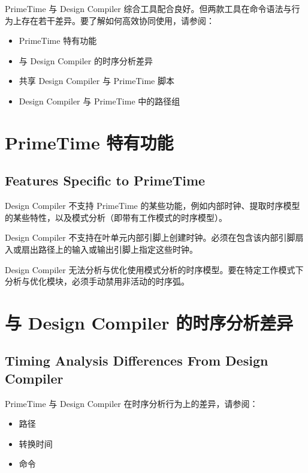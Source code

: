 \label{chap:pt-dc}

PrimeTime 与 Design Compiler 综合工具配合良好。但两款工具在命令语法与行为上存在若干差异。要了解如何高效协同使用，请参阅：
\begin{itemize}
  \item PrimeTime 特有功能
  \item 与 Design Compiler 的时序分析差异
  \item 共享 Design Compiler 与 PrimeTime 脚本
  \item Design Compiler 与 PrimeTime 中的路径组
\end{itemize}

\section{PrimeTime 特有功能}
\subsection*{Features Specific to PrimeTime}

Design Compiler 不支持 PrimeTime 的某些功能，例如内部时钟、提取时序模型的某些特性，以及模式分析（即带有工作模式的时序模型）。

Design Compiler 不支持在叶单元内部引脚上创建时钟。必须在包含该内部引脚扇入或扇出路径上的输入或输出引脚上指定这些时钟。

Design Compiler 无法分析与优化使用模式分析的时序模型。要在特定工作模式下分析与优化模块，必须手动禁用非活动的时序弧。

\section{与 Design Compiler 的时序分析差异}
\subsection*{Timing Analysis Differences From Design Compiler}

PrimeTime 与 Design Compiler 在时序分析行为上的差异，请参阅：
\begin{itemize}
  \item 路径
  \item 转换时间
  \item {} 命令
\end{itemize}

